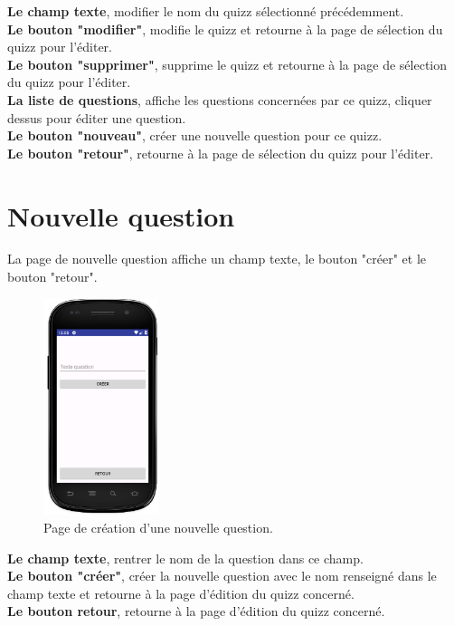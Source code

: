 \documentclass[a4paper]{report}
\begin{document}
\textbf{Le champ texte}, modifier le nom du quizz sélectionné précédemment. \\
\textbf{Le bouton "modifier"}, modifie le quizz et retourne à la page de sélection du quizz pour l'éditer. \\
\textbf{Le bouton "supprimer"}, supprime le quizz et retourne à la page de sélection du quizz pour l'éditer. \\
\textbf{La liste de questions}, affiche les questions concernées par ce quizz, cliquer dessus pour éditer une question. \\
\textbf{Le bouton "nouveau"}, créer une nouvelle question pour ce quizz. \\
\textbf{Le bouton "retour"}, retourne à la page de sélection du quizz pour l'éditer. \\


\newpage
\section{Nouvelle question}
La page de nouvelle question affiche un champ texte, le bouton "créer" et le bouton "retour".

\begin{figure}[h]
\centering
\includegraphics[width=0.3\textwidth]{newQuestion.png}
\caption{\label{fig:Nouvelle question}Page de création d'une nouvelle question.}
\end{figure}

\textbf{Le champ texte}, rentrer le nom de la question dans ce champ. \\
\textbf{Le bouton "créer"}, créer la nouvelle question avec le nom renseigné dans le champ texte et retourne à la page d'édition du quizz concerné. \\
\textbf{Le bouton retour}, retourne à la page d'édition du quizz concerné. \\
\end{document}
